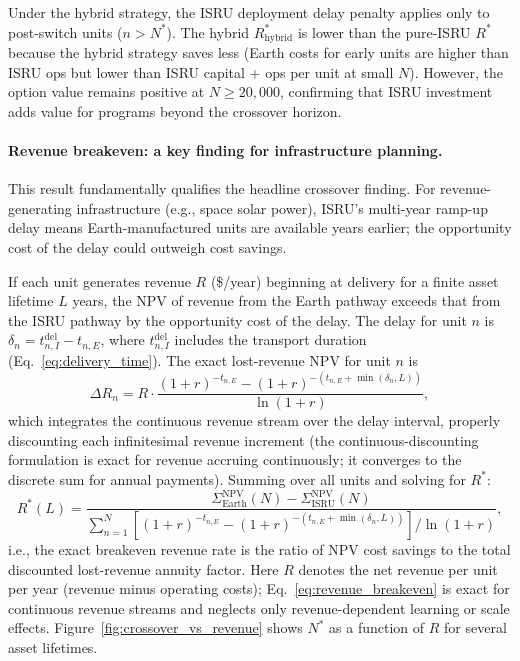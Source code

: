 \documentclass[preprint,12pt]{elsarticle}
\begin{document}
Under the hybrid strategy, the ISRU deployment delay penalty applies only to post-switch units ($n > N^*$). The hybrid $R^*_{\mathrm{hybrid}}$ is lower than the pure-ISRU $R^*$ because the hybrid strategy saves less (Earth costs for early units are higher than ISRU ops but lower than ISRU capital + ops per unit at small $N$). However, the option value remains positive at $N \geq 20{,}000$, confirming that ISRU investment adds value for programs beyond the crossover horizon.

\paragraph{Revenue breakeven: a key finding for infrastructure planning.} This result fundamentally qualifies the headline crossover finding. For revenue-generating infrastructure (e.g., space solar power), ISRU's multi-year ramp-up delay means Earth-manufactured units are available years earlier; the opportunity cost of the delay could outweigh cost savings.

If each unit generates revenue $R$ (\$/year) beginning at delivery for a finite asset lifetime $L$ years, the NPV of revenue from the Earth pathway exceeds that from the ISRU pathway by the opportunity cost of the delay. The delay for unit $n$ is $\delta_n = t_{n,I}^{\mathrm{del}} - t_{n,E}$, where $t_{n,I}^{\mathrm{del}}$ includes the transport duration (Eq.~\ref{eq:delivery_time}). The exact lost-revenue NPV for unit $n$ is
\begin{equation}
  \Delta R_n = R \cdot \frac{(1+r)^{-t_{n,E}} - (1+r)^{-(t_{n,E}+\min(\delta_n,L))}}{\ln(1+r)},
  \label{eq:exact_lost_revenue}
\end{equation}
which integrates the continuous revenue stream over the delay interval, properly discounting each infinitesimal revenue increment (the continuous-discounting formulation is exact for revenue accruing continuously; it converges to the discrete sum for annual payments). Summing over all units and solving for $R^*$:
\begin{equation}
  R^*(L) = \frac{\Sigma_{\mathrm{Earth}}^{\mathrm{NPV}}(N) - \Sigma_{\mathrm{ISRU}}^{\mathrm{NPV}}(N)}{\sum_{n=1}^{N} \left[(1+r)^{-t_{n,E}} - (1+r)^{-(t_{n,E}+\min(\delta_n,L))}\right] / \ln(1+r)},
  \label{eq:revenue_breakeven}
\end{equation}
i.e., the exact breakeven revenue rate is the ratio of NPV cost savings to the total discounted lost-revenue annuity factor. Here $R$ denotes the net revenue per unit per year (revenue minus operating costs); Eq.~\ref{eq:revenue_breakeven} is exact for continuous revenue streams and neglects only revenue-dependent learning or scale effects. Figure~\ref{fig:crossover_vs_revenue} shows $N^*$ as a function of $R$ for several asset lifetimes.
\end{document}
